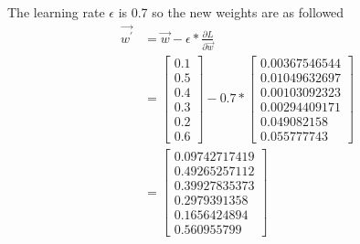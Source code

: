 \documentclass[12pt,english]{article}
\begin{document}
The learning rate $\epsilon$ is 0.7 so the new weights are as followed
\begin{align*}
\vec{w^\prime} &=\vec{w} - \epsilon* \frac{\partial L}{\partial \vec{w}}\\
&=\begin{bmatrix} 0.1\\0.5\\0.4\\0.3\\0.2\\0.6\end{bmatrix}- 
0.7* \begin{bmatrix} 0.00367546544 \\0.01049632697 \\0.00103092323\\0.00294409171\\0.049082158\\0.055777743\end{bmatrix}\\
&= \begin{bmatrix} 0.09742717419 \\0.49265257112\\0.39927835373\\0.2979391358\\0.1656424894\\0.560955799\end{bmatrix}\\
\end{align*}
\end{document}
